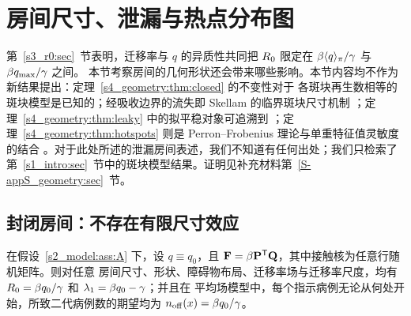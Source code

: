 \section{房间尺寸、泄漏与热点分布图}\label{s4_geometry:sec}

第~\ref{s3_r0:sec}~节表明，迁移率与 $q$ 的异质性共同把 $R_0$ 限定在 $\beta\langle q\rangle_{\pi}/\gamma$ 与 $\beta q_{\max}/\gamma$ 之间。
本节考察房间的几何形状还会带来哪些影响。本节内容均不作为新结果提出：定理~\ref{s4_geometry:thm:closed} 的不变性对于
各斑块再生数相等的斑块模型是已知的\citep{gao2011sis}；经吸收边界的流失即 Skellam 的临界斑块尺寸机制
\citep{skellam1951random,cantrell2003spatial}；定理~\ref{s4_geometry:thm:leaky} 中的拟平稳对象可追溯到
\citet{darroch1967quasi}；定理~\ref{s4_geometry:thm:hotspots} 则是 Perron--Frobenius 理论与单重特征值灵敏度的结合
\citep{berman1994nonnegative,horn2013matrix}。对于此处所述的泄漏房间表述，我们不知道有任何出处；我们只检索了
第~\ref{s1_intro:sec}~节中的斑块模型结果。证明见补充材料第~\ref{S-appS_geometry:sec}~节。

\subsection{封闭房间：不存在有限尺寸效应}\label{s4_geometry:sec:closed}

\begin{theorem}[封闭房间，均匀 $q$]\label{s4_geometry:thm:closed}
  在假设~\ref{s2_model:ass:A} 下，设 $q\equiv q_0$，且 $\mathbf{F}=\beta\mathbf{P}^{\mathsf{T}}\mathbf{Q}$，其中接触核为任意行随机矩阵。则对任意
  房间尺寸、形状、障碍物布局、迁移率场与迁移率尺度，均有 $R_0=\beta q_0/\gamma$ 和 $\lambda_1=\beta q_0-\gamma$；并且在
  平均场模型中，每个指示病例无论从何处开始，所致二代病例数的期望均为 $n_{\mathrm{off}}(x)=\beta q_0/\gamma$。
\end{theorem}

